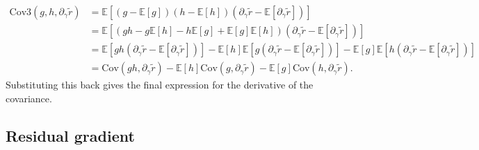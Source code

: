\documentclass{article}
\begin{document}
\begin{align}
  \mathrm{Cov3}(g, h, \partial_{\gamma} \tilde{r}) & = \mathbb{E}[(g-\mathbb{E}[g])(h-\mathbb{E}[h])(\partial_{\gamma} \tilde{r}-\mathbb{E}[\partial_{\gamma} \tilde{r}])]                                                                                                                                                                           \\
                                                   & = \mathbb{E}[(gh - g\mathbb{E}[h] - h\mathbb{E}[g] + \mathbb{E}[g]\mathbb{E}[h])(\partial_{\gamma} \tilde{r} - \mathbb{E}[\partial_{\gamma} \tilde{r}])]                                                                                                                                        \\
                                                   & = \mathbb{E}[gh(\partial_{\gamma} \tilde{r} - \mathbb{E}[\partial_{\gamma} \tilde{r}])] - \mathbb{E}[h]\mathbb{E}[g(\partial_{\gamma} \tilde{r} - \mathbb{E}[\partial_{\gamma} \tilde{r}])] - \mathbb{E}[g]\mathbb{E}[h(\partial_{\gamma} \tilde{r} - \mathbb{E}[\partial_{\gamma} \tilde{r}])] \\
                                                   & = \mathrm{Cov}(gh, \partial_{\gamma} \tilde{r}) - \mathbb{E}[h]\mathrm{Cov}(g, \partial_{\gamma} \tilde{r}) - \mathbb{E}[g]\mathrm{Cov}(h, \partial_{\gamma} \tilde{r}).
\end{align}
%
Substituting this back gives the final expression for the derivative of the covariance.

\subsection{Residual gradient}\label{sec:qrician-residual-gradient}
\end{document}
